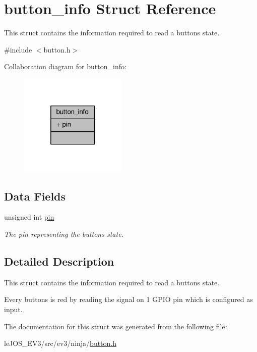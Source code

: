\hypertarget{structbutton__info}{}\section{button\+\_\+info Struct Reference}
\label{structbutton__info}


This struct contains the information required to read a buttons state.  




{\ttfamily \#include $<$button.\+h$>$}



Collaboration diagram for button\+\_\+info\+:\nopagebreak
\begin{figure}[H]
\begin{center}
\leavevmode
\includegraphics[width=145pt]{structbutton__info__coll__graph}
\end{center}
\end{figure}
\subsection*{Data Fields}
\begin{DoxyCompactItemize}
\item 
\hypertarget{structbutton__info_a867fe4e0366cbc13a194e166b96b0216}{}unsigned int \hyperlink{structbutton__info_a867fe4e0366cbc13a194e166b96b0216}{pin}\label{structbutton__info_a867fe4e0366cbc13a194e166b96b0216}

\begin{DoxyCompactList}\small\item\em The pin representing the buttons state. \end{DoxyCompactList}\end{DoxyCompactItemize}


\subsection{Detailed Description}
This struct contains the information required to read a buttons state. 

Every buttons is red by reading the signal on 1 G\+P\+I\+O pin which is configured as input. 

The documentation for this struct was generated from the following file\+:\begin{DoxyCompactItemize}
\item 
le\+J\+O\+S\+\_\+\+E\+V3/src/ev3/ninja/\hyperlink{button_8h}{button.\+h}\end{DoxyCompactItemize}

